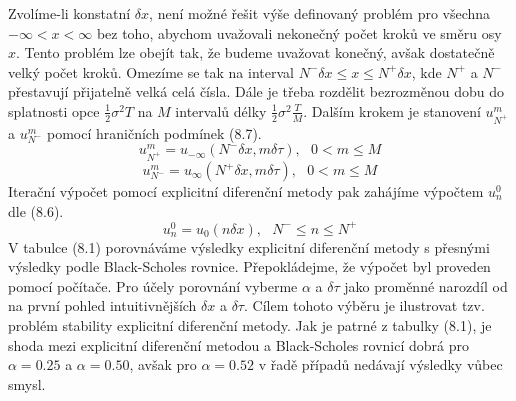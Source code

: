 \documentclass[a4paper]{book}
\begin{document}
Zvolíme-li konstatní $\delta x$, není možné řešit výše definovaný problém pro všechna $ -\infty < x < \infty$ bez toho, abychom uvažovali nekonečný počet kroků ve směru osy $x$. Tento problém lze obejít tak, že budeme uvažovat konečný, avšak dostatečně velký počet kroků. Omezíme se tak na interval $N^{-} \delta x \le x \le N^{+} \delta x$, kde $N^{+}$ a $N^{-}$ přestavují přijatelně velká celá čísla. Dále je třeba rozdělit bezrozměnou dobu do splatnosti opce $\frac{1}{2} \sigma^2 T$ na $M$ intervalů délky $\frac{1}{2} \sigma^2 \frac{T}{M}$. Dalším krokem je stanovení $u_{N^{+}}^m$ a $u_{N^{-}}^m$ pomocí hraničních podmínek (8.7).
\begin{equation*}
u_{N^{+}}^m = u_{-\infty}(N^{-} \delta x, m \delta \tau),~~~ 0 < m \le M
\end{equation*}
\begin{equation}
u_{N^{-}}^m = u_{\infty}(N^{+} \delta x, m \delta \tau),~~~ 0 < m \le M
\end{equation}
Iterační výpočet pomocí explicitní diferenční metody pak zahájíme výpočtem $u_n^0$ dle (8.6).
\begin{equation}
u_n^0 = u_0(n \delta x),~~~N^{-} \le n \le N^{+}
\end{equation}
V tabulce (8.1) porovnáváme výsledky explicitní diferenční metody s přesnými výsledky podle Black-Scholes rovnice. Přepokládejme, že výpočet byl proveden pomocí počítače. Pro účely porovnání vyberme $\alpha$ a $\delta \tau$ jako proměnné narozdíl od na první pohled intuitivnějších $\delta x$ a $\delta \tau$. Cílem tohoto výběru je ilustrovat tzv. problém stability explicitní diferenční metody. Jak je patrné z tabulky (8.1), je shoda mezi explicitní diferenční metodou a Black-Scholes rovnicí dobrá pro $\alpha = 0.25$ a $\alpha = 0.50$, avšak pro $\alpha = 0.52$ v řadě případů nedávají výsledky vůbec smysl.
\end{document}
